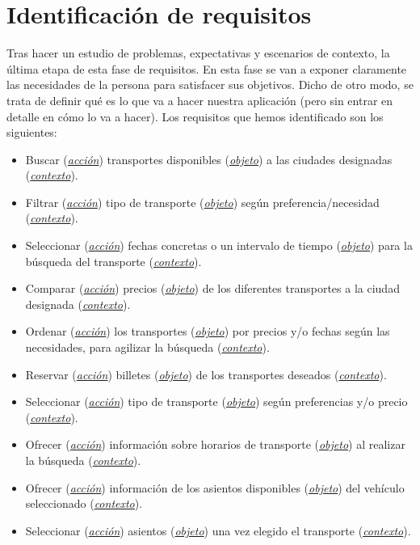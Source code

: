 \section{Identificación de requisitos}
Tras hacer un estudio de problemas, expectativas y escenarios de contexto, la última etapa de esta fase de requisitos. En esta fase se van a exponer claramente las 
necesidades de la persona para satisfacer sus objetivos. Dicho de otro modo, se trata de definir qué es lo que va a hacer nuestra aplicación (pero sin entrar en
detalle en cómo lo va a hacer). Los requisitos que hemos identificado son los siguientes:
\begin{itemize}
    \item Buscar (\textit{\underline{acción}}) transportes disponibles (\textit{\underline{objeto}}) a las ciudades designadas (\textit{\underline{contexto}}).
    \item Filtrar (\textit{\underline{acción}}) tipo de transporte (\textit{\underline{objeto}}) según preferencia/necesidad (\textit{\underline{contexto}}).
    \item Seleccionar (\textit{\underline{acción}}) fechas concretas o un intervalo de tiempo (\textit{\underline{objeto}}) para la búsqueda del transporte (\textit{\underline{contexto}}).
    \item Comparar (\textit{\underline{acción}}) precios (\textit{\underline{objeto}}) de los diferentes transportes a la ciudad designada (\textit{\underline{contexto}}).
    \item Ordenar (\textit{\underline{acción}}) los transportes (\textit{\underline{objeto}}) por precios y/o fechas según las necesidades, para agilizar la búsqueda (\textit{\underline{contexto}}).
    \item Reservar (\textit{\underline{acción}}) billetes (\textit{\underline{objeto}}) de los transportes deseados (\textit{\underline{contexto}}).
    \item Seleccionar (\textit{\underline{acción}}) tipo de transporte (\textit{\underline{objeto}}) según preferencias y/o precio (\textit{\underline{contexto}}).
    \item Ofrecer (\textit{\underline{acción}}) información sobre horarios de transporte (\textit{\underline{objeto}}) al realizar la búsqueda (\textit{\underline{contexto}}).
    \item Ofrecer (\textit{\underline{acción}}) información de los asientos disponibles (\textit{\underline{objeto}}) del vehículo seleccionado (\textit{\underline{contexto}}).
    \item Seleccionar (\textit{\underline{acción}}) asientos (\textit{\underline{objeto}}) una vez elegido el transporte (\textit{\underline{contexto}}).

\end{itemize}
